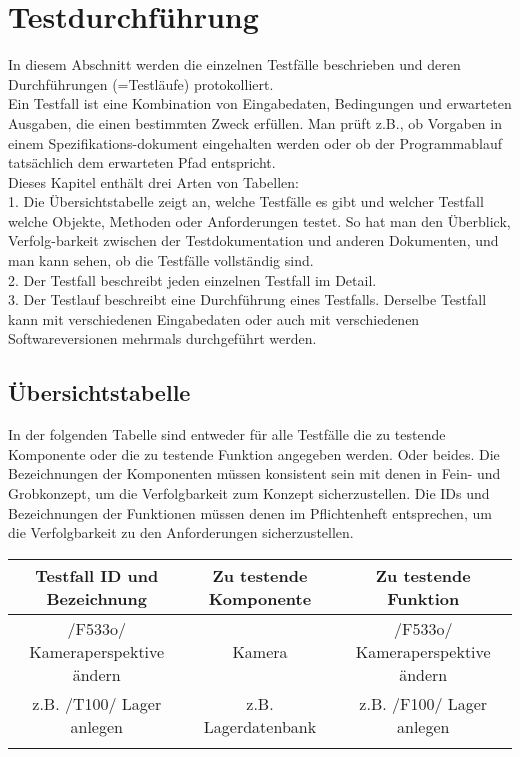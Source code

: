 
\chapter{Testdurchführung}

In diesem Abschnitt werden die einzelnen Testfälle beschrieben und deren
Durchführungen (=Testläufe) protokolliert.\\
Ein Testfall ist eine Kombination von Eingabedaten, Bedingungen und erwarteten
Ausgaben, die einen bestimmten Zweck erfüllen. Man prüft z.B., ob Vorgaben in
einem Spezifikations-dokument eingehalten werden oder ob der Programmablauf
tatsächlich dem erwarteten Pfad entspricht.\\
Dieses Kapitel enthält drei Arten von Tabellen:\\
1.  Die Übersichtstabelle zeigt an, welche Testfälle es gibt und welcher
Testfall welche Objekte, Methoden oder Anforderungen testet. So hat man den
Überblick, Verfolg-barkeit zwischen der Testdokumentation und anderen
Dokumenten, und man kann sehen, ob die Testfälle vollständig sind.\\
2.  Der Testfall beschreibt jeden einzelnen Testfall im Detail.\\
3.  Der Testlauf beschreibt eine Durchführung eines Testfalls. Derselbe
Testfall kann mit verschiedenen Eingabedaten oder auch mit verschiedenen
Softwareversionen mehrmals durchgeführt werden.\\

\section{Übersichtstabelle}
  In der folgenden Tabelle sind entweder für alle Testfälle die zu testende
  Komponente oder die zu testende Funktion angegeben werden. Oder beides. Die
  Bezeichnungen der Komponenten müssen konsistent sein mit denen in Fein- und
  Grobkonzept, um die Verfolgbarkeit zum Konzept sicherzustellen. Die IDs und
  Bezeichnungen der Funktionen müssen denen im Pflichtenheft entsprechen, um
  die Verfolgbarkeit zu den Anforderungen sicherzustellen. \\
\begin{tabular}{|c|c|c|}
\hline
\textbf{Testfall ID und Bezeichnung} &  \textbf {Zu testende Komponente} &
\textbf {Zu testende Funktion}\\
\hline
/F533o/ Kameraperspektive ändern &  Kamera  & /F533o/ Kameraperspektive ändern \\
\hline
z.B. /T100/ Lager anlegen &  z.B. Lagerdatenbank  & z.B. /F100/ Lager anlegen \\
\hline
&&
\end{tabular}

